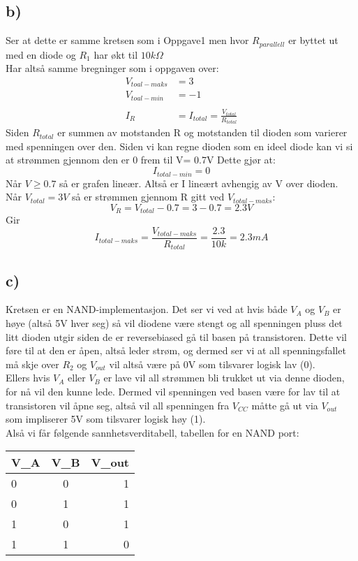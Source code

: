 \documentclass[a4paper, norsk, twoside, 10pt]{article}
\begin{document}
\subsection*{b)}
Ser at dette er samme kretsen som i Oppgave1 men hvor $R_{parallell}$ er byttet ut med en diode og $R_{1}$ har økt til $10k \Omega$ \\
Har altså samme bregninger som i oppgaven over:
\begin{align*}
  V_{toal-maks} &= 3\\
  V_{toal-min} &= -1\\
  \\
  I_{R} &= I_{total} = \frac{V_{total}}{R_{total}}
\end{align*}
Siden $R_{total}$ er summen av motstanden R og motstanden til dioden som varierer med spenningen over den. Siden vi kan regne dioden som en ideel diode kan vi si at strømmen gjennom den er 0 frem til V= 0.7V Dette gjør at:
\[I_{total-min} = 0 \]
Når $V \geq 0.7$ så er grafen lineær. Altså er I lineært avhengig av V over dioden. Når $V_{total} = 3V$ så er strømmen gjennom R gitt ved $V_{total-maks}$:
\[V_{R} = V_{total} - 0.7 = 3-0.7 = 2.3V\]
Gir
\[I_{total-maks} =  \frac{V_{total-maks}}{R_{total}} = \frac{2.3}{10k} = 2.3mA\]





\subsection*{c)}

Kretsen er en NAND-implementasjon. Det ser vi ved at hvis både $V_A$ og $V_B$ er høye (altså 5V hver seg) så vil diodene være stengt og all spenningen pluss det litt dioden utgir siden de er reversebiased gå til basen på transistoren. Dette vil føre til at den er åpen, altså leder strøm, og dermed ser vi at all spenningsfallet må skje over $R_2$ og $V_{out}$ vil altså være på 0V som tilsvarer logisk lav (0).\\
Ellers hvis $V_A$ eller $V_B$ er lave vil all strømmen bli trukket ut via denne dioden, for nå vil den kunne lede. Dermed vil spenningen ved basen være for lav til at transistoren vil åpne seg, altså vil all spenningen fra $V_{CC}$ måtte gå ut via $V_{out}$ som impliserer 5V som tilsvarer logisk høy (1). \\
Alså vi får følgende sannhetsverditabell, tabellen for en NAND port:

\begin{tabular}{|l|c||r}
  \hline
  V_A & V_B & V_{out} \\
  \hline
  0 & 0 & 1 \\
  0 & 1 & 1 \\
  1 & 0 & 1 \\
  1 & 1 & 0 \\
  \hline
\end{tabular}
  
\end{document}

